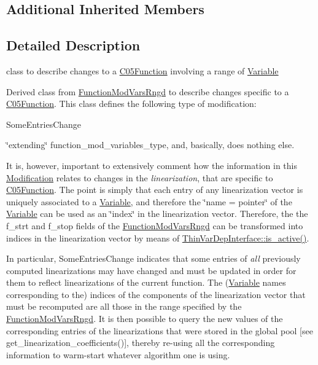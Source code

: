 \subsection*{Additional Inherited Members}


\subsection{Detailed Description}
class to describe changes to a \mbox{\hyperlink{class_s_m_spp__di__unipi__it_1_1_c05_function}{C05\+Function}} involving a range of \mbox{\hyperlink{class_s_m_spp__di__unipi__it_1_1_variable}{Variable}} 

Derived class from \mbox{\hyperlink{class_s_m_spp__di__unipi__it_1_1_function_mod_vars_rngd}{Function\+Mod\+Vars\+Rngd}} to describe changes specific to a \mbox{\hyperlink{class_s_m_spp__di__unipi__it_1_1_c05_function}{C05\+Function}}. This class defines the following type of modification\+:


\begin{DoxyItemize}
\item Some\+Entries\+Change
\end{DoxyItemize}

\char`\"{}extending\char`\"{} function\+\_\+mod\+\_\+variables\+\_\+type, and, basically, does nothing else.

It is, however, important to extensively comment how the information in this \mbox{\hyperlink{class_s_m_spp__di__unipi__it_1_1_modification}{Modification}} relates to changes in the {\itshape linearization}, that are specific to \mbox{\hyperlink{class_s_m_spp__di__unipi__it_1_1_c05_function}{C05\+Function}}. The point is simply that each entry of any linearization vector is uniquely associated to a \mbox{\hyperlink{class_s_m_spp__di__unipi__it_1_1_variable}{Variable}}, and therefore the \char`\"{}name = pointer\char`\"{} of the \mbox{\hyperlink{class_s_m_spp__di__unipi__it_1_1_variable}{Variable}} can be used as an \char`\"{}index\char`\"{} in the linearization vector. Therefore, the the f\+\_\+strt and f\+\_\+stop fields of the \mbox{\hyperlink{class_s_m_spp__di__unipi__it_1_1_function_mod_vars_rngd}{Function\+Mod\+Vars\+Rngd}} can be transformed into indices in the linearization vector by means of \mbox{\hyperlink{group___thin_var_dep_interface___c_l_a_s_s_e_s_ga05297a4e506f89ec692a01aca971ce2d}{Thin\+Var\+Dep\+Interface\+::is\+\_\+active()}}.

In particular, Some\+Entries\+Change indicates that some entries of {\itshape all} previously computed linearizations may have changed and must be updated in order for them to reflect linearizations of the current function. The (\mbox{\hyperlink{class_s_m_spp__di__unipi__it_1_1_variable}{Variable}} names corresponding to the) indices of the components of the linearization vector that must be recomputed are all those in the range specified by the \mbox{\hyperlink{class_s_m_spp__di__unipi__it_1_1_function_mod_vars_rngd}{Function\+Mod\+Vars\+Rngd}}. It is then possible to query the new values of the corresponding entries of the linearizations that were stored in the global pool \mbox{[}see get\+\_\+linearization\+\_\+coefficients()\mbox{]}, thereby re-\/using all the corresponding information to warm-\/start whatever algorithm one is using.

